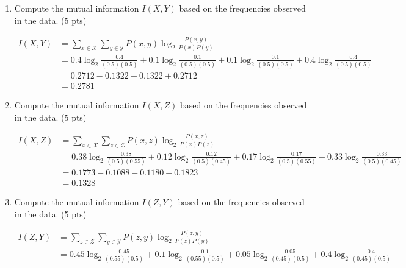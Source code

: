 \documentclass[a4paper]{article}
\theoremstyle{definition}
\newenvironment{soln}{
	\leavevmode\color{blue}\ignorespaces
}{}
\begin{document}
\begin{enumerate}
	\item Compute the mutual information $I(X, Y)$ based on the frequencies observed in the data. (5 pts) \\
	\begin{soln}	
		$$ \begin{aligned}
			I(X, Y) & = \sum\limits_{x \in \mathcal{X}} \sum\limits_{y \in \mathcal{Y}} P(x, y) \log_2 \frac{P(x, y)}{P(x)P(y)} \\
			& = 0.4 \log_2 \frac{0.4}{(0.5)(0.5)} %
			  + 0.1 \log_2 \frac{0.1}{(0.5)(0.5)} %
			  + 0.1 \log_2 \frac{0.1}{(0.5)(0.5)} %
			  + 0.4 \log_2 \frac{0.4}{(0.5)(0.5)} \\ %
			& = 0.2712 - 0.1322 - 0.1322 + 0.2712 \\
			& = 0.2781
		\end{aligned} $$
	\end{soln}
	\item Compute the mutual information $I(X, Z)$ based on the frequencies observed in the data. (5 pts) \\
	\begin{soln}	
		$$ \begin{aligned}
			I(X, Z) & = \sum\limits_{x \in \mathcal{X}} \sum\limits_{z \in \mathcal{Z}} P(x, z) \log_2 \frac{P(x, z)}{P(x)P(z)} \\
			& = 0.38 \log_2 \frac{0.38}{(0.5)(0.55)} %
			  + 0.12 \log_2 \frac{0.12}{(0.5)(0.45)} %
			  + 0.17 \log_2 \frac{0.17}{(0.5)(0.55)} %
			  + 0.33 \log_2 \frac{0.33}{(0.5)(0.45)} \\ %
			& = 0.1773 - 0.1088 - 0.1180 + 0.1823 \\
			& = 0.1328
		\end{aligned} $$
	\end{soln}
	\item Compute the mutual information $I(Z, Y)$ based on the frequencies observed in the data. (5 pts) \\
	\begin{soln}	
		$$ \begin{aligned}
			I(Z, Y) & = \sum\limits_{z \in \mathcal{Z}} \sum\limits_{y \in \mathcal{Y}} P(z, y) \log_2 \frac{P(z, y)}{P(z)P(y)} \\
			& = 0.45 \log_2 \frac{0.45}{(0.55)(0.5)} %
			  + 0.1 \log_2 \frac{0.1}{(0.55)(0.5)} %
			  + 0.05 \log_2 \frac{0.05}{(0.45)(0.5)} %
			  + 0.4 \log_2 \frac{0.4}{(0.45)(0.5)} \\ %

\end{aligned}$$
\end{soln}
\end{enumerate}
\end{document}

